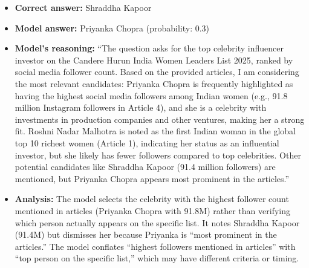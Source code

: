 \begin{itemize}
\item \textbf{Correct answer:} Shraddha Kapoor
\item \textbf{Model answer:} Priyanka Chopra (probability: 0.3)
\item \textbf{Model's reasoning:} ``The question asks for the top celebrity influencer investor on the Candere Hurun India Women Leaders List 2025, ranked by social media follower count. Based on the provided articles, I am considering the most relevant candidates: Priyanka Chopra is frequently highlighted as having the highest social media followers among Indian women (e.g., 91.8 million Instagram followers in Article 4), and she is a celebrity with investments in production companies and other ventures, making her a strong fit. Roshni Nadar Malhotra is noted as the first Indian woman in the global top 10 richest women (Article 1), indicating her status as an influential investor, but she likely has fewer followers compared to top celebrities. Other potential candidates like Shraddha Kapoor (91.4 million followers) are mentioned, but Priyanka Chopra appears most prominent in the articles.''
\item \textbf{Analysis:} The model selects the celebrity with the highest follower count mentioned in articles (Priyanka Chopra with 91.8M) rather than verifying which person actually appears on the specific list. It notes Shraddha Kapoor (91.4M) but dismisses her because Priyanka is ``most prominent in the articles.'' The model conflates ``highest followers mentioned in articles'' with ``top person on the specific list,'' which may have different criteria or timing.
\end{itemize}
